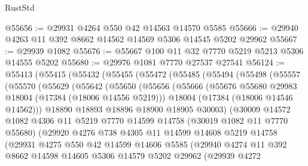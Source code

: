 \begin{lexlean}{RustStd}
\begin{coremodule}
@55656 := @29931 @4264 @550 @42 @14563 @14570 @5585
@55666 := @29940 @4263 @11 @392 @8662 @14562 @14569 @5306 @14545 @5202 @29962
@55667 := @29939 @1082
@55676 := @55667 @100 @11 @32 @7770 @5219 @5213 @5306 @14555 @5202
@55680 := @29976 @1081 @7770 @27537 @27541
@56124 := @55413
    (@55415
      (@55432
        (@55455
          (@55472
            (@55485
              (@55494
                (@55498
                  (@55557
                    (@55570
                      (@55629
                        (@55642
                          (@55650
                            (@55656
                              (@55666
                                (@55676 @55680 @29983 @18004 (@17384 (@18006 @14556 @5219)))
                                @18004
                                (@17384 (@18006 @14546 @14562)))
                              @18890
                              @18893
                              @18896
                              @18900
                              @18905
                              @30003)
                            (@30009
                              @14572
                              @1082
                              @4306
                              @11
                              @5219
                              @7770
                              @14599
                              @14758
                              (@30019 @1082 @11 @7770 @55680)
                              (@29920
                                @4276
                                @738
                                @4305
                                @11
                                @14599
                                @14608
                                @5219
                                @14758
                                (@29931
                                  @4275
                                  @550
                                  @42
                                  @14599
                                  @14606
                                  @5585
                                  (@29940
                                    @4274
                                    @11
                                    @392
                                    @8662
                                    @14598
                                    @14605
                                    @5306
                                    @14579
                                    @5202
                                    @29962
                                    (@29939
                                      @4272

\end{coremodule}
\end{lexlean}
